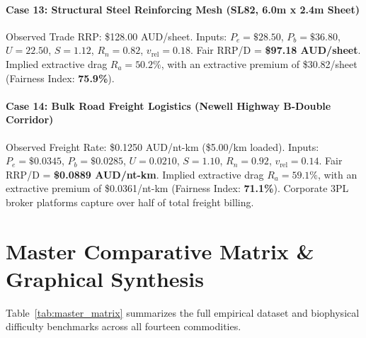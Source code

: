 \documentclass[preprint,12pt,authoryear]{elsarticle}
\begin{document}
\paragraph{Case 13: Structural Steel Reinforcing Mesh (SL82, 6.0m x 2.4m Sheet)}
Observed Trade RRP: \$128.00 AUD/sheet. Inputs: $P_e = \$28.50$, $P_b = \$36.80$, $U = 22.50$, $S = 1.12$, $R_n = 0.82$, $v_{\text{rel}} = 0.18$. Fair RRP/D = \textbf{\$97.18 AUD/sheet}. Implied extractive drag $R_a = \mathbf{50.2\%}$, with an extractive premium of \$30.82/sheet (Fairness Index: \textbf{75.9\%}).

\paragraph{Case 14: Bulk Road Freight Logistics (Newell Highway B-Double Corridor)}
Observed Freight Rate: \$0.1250 AUD/nt-km (\$5.00/km loaded). Inputs: $P_e = \$0.0345$, $P_b = \$0.0285$, $U = 0.0210$, $S = 1.10$, $R_n = 0.92$, $v_{\text{rel}} = 0.14$. Fair RRP/D = \textbf{\$0.0889 AUD/nt-km}. Implied extractive drag $R_a = \mathbf{59.1\%}$, with an extractive premium of \$0.0361/nt-km (Fairness Index: \textbf{71.1\%}). Corporate 3PL broker platforms capture over half of total freight billing.

\section{Master Comparative Matrix \& Graphical Synthesis}

Table~\ref{tab:master_matrix} summarizes the full empirical dataset and biophysical difficulty benchmarks across all fourteen commodities.
\end{document}
